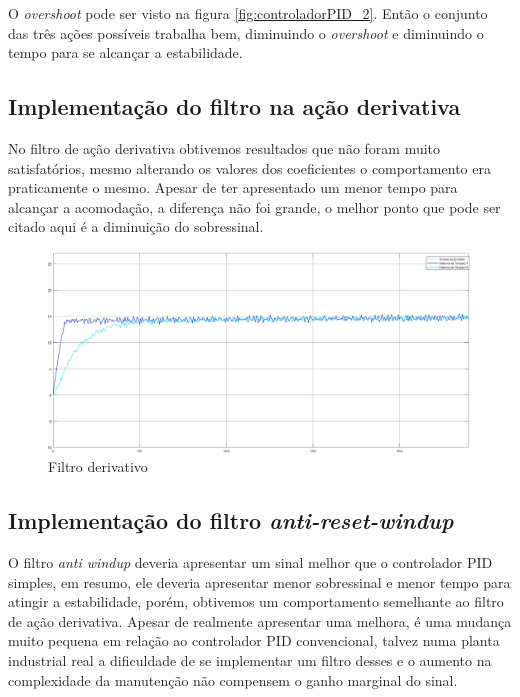 \documentclass[
	12pt,				%
	openany,			%
	oneside,			%
	a4paper,			%
	english,			%
	french,				%
	spanish,			%
	brazil,				%
	]{abntex2}
\begin{document}
{O \textit{overshoot} pode ser visto na figura \ref{fig:controladorPID_2}. Então o conjunto das três ações possíveis trabalha bem, diminuindo o \textit{overshoot} e diminuindo o tempo para se alcançar a estabilidade.

\clearpage
\subsection{Implementação do filtro na ação derivativa}

No filtro de ação derivativa obtivemos resultados que não foram muito satisfatórios, mesmo alterando os valores dos coeficientes o comportamento era praticamente o mesmo. Apesar de ter apresentado um menor tempo para alcançar a acomodação, a diferença não foi grande, o melhor ponto que pode ser citado aqui é a diminuição do sobressinal.

\begin{figure}[h]
	\centering
	\includegraphics[scale=0.20]{Filtro_derivativo_1.jpg}
	\caption{Filtro derivativo}
\end{figure}

\subsection{Implementação do filtro \textit{anti-reset-windup}}

O filtro \textit{anti windup} deveria apresentar um sinal melhor que o controlador PID simples, em resumo, ele deveria apresentar menor sobressinal e menor tempo para atingir a estabilidade, porém, obtivemos um comportamento semelhante ao filtro de ação derivativa. Apesar de realmente apresentar uma melhora, é uma mudança muito pequena em relação ao controlador PID convencional, talvez numa planta industrial real a dificuldade de se implementar um filtro desses e o aumento na complexidade da manutenção não compensem o ganho marginal do sinal.

}
\end{document}
